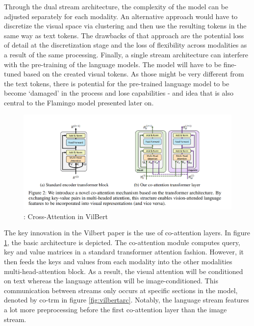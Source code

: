 \documentclass[
]{krantz}
\begin{document}
Through the dual stream architecture, the complexity of the model can be adjusted separately for each modality. An alternative approach would have to discretize the visual space via clustering and then use the resulting tokens in the same way as text tokens. The drawbacks of that approach are the potential loss of detail at the discretization stage and the loss of flexibility across modalities as a result of the same processing. Finally, a single stream architecture can interfere with the pre-training of the language models. The model will have to be fine-tuned based on the created visual tokens. As those might be very different from the text tokens, there is potential for the pre-trained language model to be become `damaged' in the process and lose capabilities - and idea that is also central to the Flamingo model presented later on.

\begin{figure}

{\centering \includegraphics[width=1\linewidth]{figures/05-chapter2/vilbertattention} 

}

\caption{\citet{lu2019vilbert}: Cross-Attention in VilBert}\label{fig:vilbertattention}
\end{figure}



The key innovation in the Vilbert paper \citep{lu2019vilbert} is the use of co-attention layers. In figure \ref{fig:vilbertattention}, the basic architecture is depicted. The co-attention module computes query, key and value matrices in a standard transformer attention fashion. However, it then feeds the keys and values from each modality into the other modalities multi-head-attention block. As a result, the visual attention will be conditioned on text whereas the language attention will be image-conditioned. This communication between streams only occurs at specific sections in the model, denoted by co-trm in figure \ref{fig:vilbertarc}. Notably, the language stream features a lot more preprocessing before the first co-attention layer than the image stream.
\end{document}

